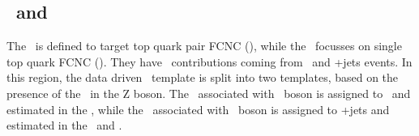 \subsection{\TTSR\ and \STSR}
The \TTSR\ is defined to target top quark pair FCNC (\tZq), while the \STSR\ focusses on single top quark FCNC (\tZ). They have \NPL\ contributions coming from \DY\ and \ttbar+jets events. In this region, the data driven \NPL\ template is split into two templates, based on the presence of the \NPL\ in the Z boson. The \NPL\ associated with \PW\ boson is assigned to \DY\ and estimated in the \WZCR, while  the \NPL\ associated with \PZ\ boson is assigned to \ttbar+jets and estimated in the \TTCR\ and \STCR.




